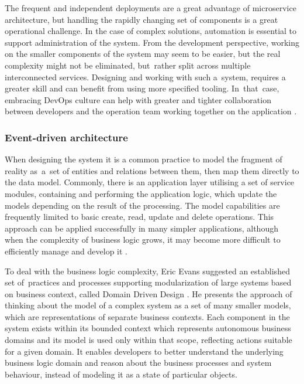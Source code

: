 The frequent and independent deployments are a great advantage of microservice architecture, but handling the rapidly changing set of components is a great operational challenge. In the case of complex solutions, automation is essential to support administration of the system. From the development perspective, working on the smaller components of the system may seem to be easier, but the real complexity might not be eliminated, but~rather split across multiple interconnected services. Designing and working with such a~system, requires a greater skill and can benefit from using more specified tooling. In~that~case, embracing DevOps culture can help with greater and tighter collaboration between developers and the operation team working together on the application \cite{FowlerMicroservicesTradeoffs}.

\subsubsection{Event-driven architecture} \label{chapter:event-driven-architecture}

When designing the system it is a common practice to model the fragment of reality as~a~set of entities and relations between them, then map them directly to the data model. Commonly, there is an application layer utilising a set of service modules, containing and performing the application logic, which update the models depending on the result of the processing. The model capabilities are frequently limited to basic create, read, update and delete operations. This approach can be applied successfully in many simpler applications, although when the complexity of business logic grows, it may become more difficult to efficiently manage and develop it \cite{FowlerAnemicModel}.

To deal with the business logic complexity, Eric Evans suggested an established set of~practices and processes supporting modularization of large systems based on business context, called Domain Driven Design \cite{EvansDDD}. He presents the approach of thinking about the model of a complex system as a set of many smaller models, which are representations of separate business contexts. Each component in the system exists within its bounded context which represents autonomous business domains and its model is used only within that scope, reflecting actions suitable for a given domain. It enables developers to better understand the underlying business logic domain and reason about the business processes and system behaviour, instead of modeling it as a state of particular objects.

